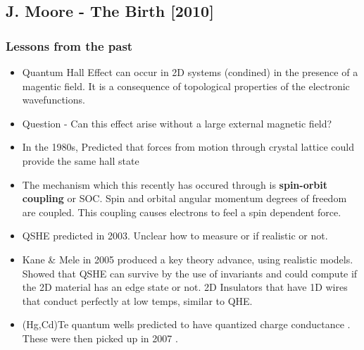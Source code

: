 \documentclass[../mattg_ti-fi_lit-review.tex]{subfiles}
\begin{document}
	\subsection{J. Moore - The Birth\cite{moore_birth_2010} [2010]}
	\subsubsection{Lessons from the past}
	\begin{itemize}
		\item Quantum Hall Effect can occur in 2D systems (condined) in the presence of a magentic field. It is a consequence of topological properties of the electronic wavefunctions. 
		\item Question - Can this effect arise without a large external magnetic field?
		\item In the 1980s, Predicted that forces from motion through crystal lattice could provide the same hall state \cite{haldane_model_1988}
		\item The mechanism which this recently has occured through is \textbf{spin-orbit coupling} or SOC. Spin and orbital angular momentum degrees of freedom are coupled. This coupling causes electrons to feel a spin dependent force.
		\item QSHE predicted in 2003. Unclear how to measure or if realistic or not. \cite{murakami_dissipationless_2003, murakami_spin-hall_2004}
		\item Kane \& Mele in 2005 produced a key theory advance, using realistic models. Showed that QSHE can survive by the use of invariants and could compute if the 2D material has an edge state or not. 2D Insulators that have 1D wires that conduct perfectly at low temps, similar to QHE. \cite{kane_z_2005}
		\item (Hg,Cd)Te quantum wells predicted to have quantized charge conductance  \cite{bernevig_quantum_2006}. These were then picked up in 2007 \cite{konig_quantum_2007}.
	\end{itemize}
\end{document}
